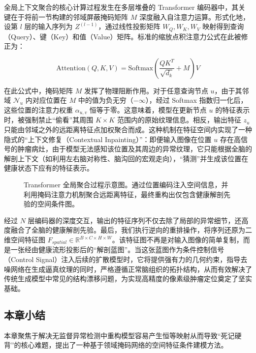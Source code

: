 \documentclass[Win]{xjtuBSThesis}  %
\begin{document}
全局上下文聚合的核心计算过程发生在多层堆叠的 Transformer 编码器中，其关键在于将前一节构建的邻域屏蔽掩码矩阵 $M$ 深度融入自注意力运算。形式化地，设第 $l$ 层的输入序列为 $Z^{(l-1)}$，通过线性投影矩阵 $W_Q, W_K, W_V$ 映射得到查询（Query）、键（Key）和值（Value）矩阵。标准的缩放点积注意力公式在此被修正为：

\begin{equation}
    \text{Attention}(Q, K, V) = \text{Softmax}\left( \frac{QK^T}{\sqrt{d_k}} + M \right) V
\end{equation}

在此公式中，掩码矩阵 $M$ 发挥了物理阻断作用。对于任意查询节点 $u$，由于其邻域 $\mathcal{N}_u$ 内对应位置在 $M$ 中的值为负无穷（$-\infty$），经过 Softmax 指数归一化后，这些位置的注意力权重 $\alpha_{u,v}$ 恒等于零。这意味着，模型在更新节点 $u$ 的特征表示时，被强制禁止“偷看”其周围 $K \times K$ 范围内的原始纹理信息。相反，输出特征 $z_u$ 只能由邻域之外的远距离特征点加权聚合而成。这种机制在特征空间内实现了一种隐式的“上下文修复（Contextual Inpainting）”：即便输入图像在位置 $u$ 存在高信号的肿瘤病灶，由于模型无法感知该位置及其周边的异常纹理，它只能根据全脑的解剖上下文（如利用左右脑对称性、脑沟回的宏观走向），“猜测”并生成该位置在健康状态下应有的特征表示。

\begin{figure}[htbp]
    \centering
    \caption{Transformer 全局聚合过程示意图。通过位置编码注入空间信息，并利用掩码注意力机制聚合远距离特征，最终重构出仅包含健康解剖先验的空间条件图。}
    \label{fig:transformer_agg_process}
\end{figure}

经过 $N$ 层编码器的深度交互，输出的特征序列不仅去除了局部的异常细节，还高度融合了全脑的健康解剖先验。最后，我们执行逆向的重排操作，将序列还原为二维空间特征图 $F_{spatial} \in \mathbb{R}^{B \times C \times H \times W}$。该特征图不再是对输入图像的简单复制，而是一张经由健康流形投影后的“解剖蓝图”。当这张蓝图作为条件控制信号（Control Signal）注入后续的扩散模型时，它将提供强有力的几何约束，指导去噪网络在生成逼真纹理的同时，严格遵循正常脑组织的拓扑结构，从而有效解决了传统生成模型中常见的结构漂移问题，为实现高精度的像素级肿瘤定位奠定了坚实基础。


\subsection{本章小结}

本章聚焦于解决无监督异常检测中重构模型容易产生恒等映射从而导致“死记硬背”的核心难题，提出了一种基于领域掩码网络的空间特征条件建模方法。
\end{document}
